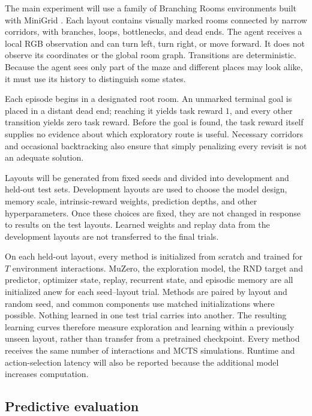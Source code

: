 \documentclass{article}
\begin{document}
The main experiment will use a family of Branching Rooms environments built
with
MiniGrid \citep{minigrid}. Each layout contains visually marked rooms connected
by narrow corridors, with branches, loops, bottlenecks, and dead ends. The
agent receives a local RGB observation and can turn left, turn right, or move
forward. It does not observe its coordinates or the global room graph.
Transitions are deterministic. Because the agent sees only part of the maze
and different places may look alike, it must use its history to distinguish
some states.

Each episode begins in a designated root room. An unmarked terminal goal is
placed in a distant dead end; reaching it yields task reward $1$, and every
other transition yields zero task reward. Before the goal is found, the task
reward itself supplies no evidence about which exploratory route is useful.
Necessary corridors and occasional backtracking also ensure that simply
penalizing every revisit is not an adequate solution.

Layouts will be generated from fixed seeds and divided into development and
held-out test sets. Development layouts are used to choose the model design,
memory scale, intrinsic-reward weights, prediction depths, and other
hyperparameters. Once these choices are fixed, they are not changed in response
to results on the test layouts. Learned weights and replay data from the
development layouts are not transferred to the final trials.

On each held-out layout, every method is initialized from scratch and trained
for $T$ environment interactions. MuZero, the exploration model, the RND
target and predictor, optimizer state, replay, recurrent state, and episodic
memory are all initialized anew for each seed--layout trial. Methods are paired
by layout and random seed, and common components use matched initializations
where possible.
Nothing learned in one test trial carries into another. The resulting learning
curves therefore measure exploration and learning within a previously unseen
layout, rather than transfer from a pretrained checkpoint. Every method
receives the same number of interactions and MCTS simulations. Runtime and
action-selection latency will also be reported because the additional model
increases computation.

\subsection{Predictive evaluation}
\end{document}
